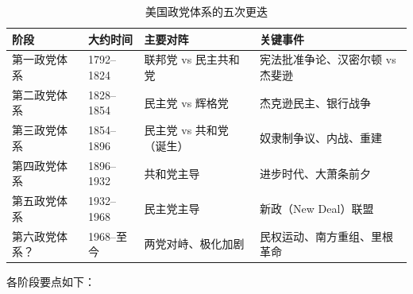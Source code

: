 \documentclass[12pt,a4paper]{ctexart}
\begin{document}
\begin{table}[h]
\centering
\caption{美国政党体系的五次更迭}
\begin{tabular}{@{}lp{2.8cm}p{4.2cm}p{6.0cm}@{}}
\toprule
\textbf{阶段} & \textbf{大约时间} & \textbf{主要对阵} & \textbf{关键事件} \\
\midrule
第一政党体系 & 1792--1824 & 联邦党 vs 民主共和党 & 宪法批准争论、汉密尔顿 vs 杰斐逊 \\
第二政党体系 & 1828--1854 & 民主党 vs 辉格党 & 杰克逊民主、银行战争 \\
第三政党体系 & 1854--1896 & 民主党 vs 共和党（诞生） & 奴隶制争议、内战、重建 \\
第四政党体系 & 1896--1932 & 共和党主导 & 进步时代、大萧条前夕 \\
第五政党体系 & 1932--1968 & 民主党主导 & 新政（New Deal）联盟 \\
第六政党体系？ & 1968--至今 & 两党对峙、极化加剧 & 民权运动、南方重组、里根革命 \\
\bottomrule
\end{tabular}
\end{table}

各阶段要点如下：
\end{document}
